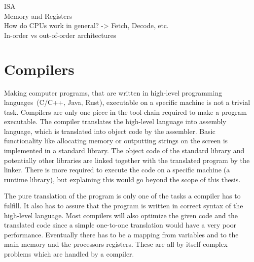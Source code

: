 ISA\\
Memory and Registers\\
How do CPUs work in general? -> Fetch, Decode, etc.\\
In-order vs out-of-order architectures

\section{Compilers}
\label{sec:bg:compilers}
%
Making computer programs, that are written in high-level programming languages~(\eg C/C++, Java, Rust), executable on a specific machine is not a trivial task.
Compilers are only one piece in the tool-chain required to make a program executable.
The compiler translates the high-level language into assembly language, which is translated into object code by the assembler.
Basic functionality like allocating memory or outputting strings on the screen is implemented in a standard library.
The object code of the standard library and potentially other libraries are linked together with the translated program by the linker.
There is more required to execute the code on a specific machine (\eg a runtime library), but explaining this would go beyond the scope of this thesis.

The pure translation of the program is only one of the tasks a compiler has to fulfill.
It also has to assure that the program is written in correct syntax of the high-level language.
Most compilers will also optimize the given code and the translated code since a simple one-to-one translation would have a very poor performance.
Eventually there has to be a mapping from variables and to the main memory and the processors registers.
These are all by itself complex problems which are handled by a compiler.

